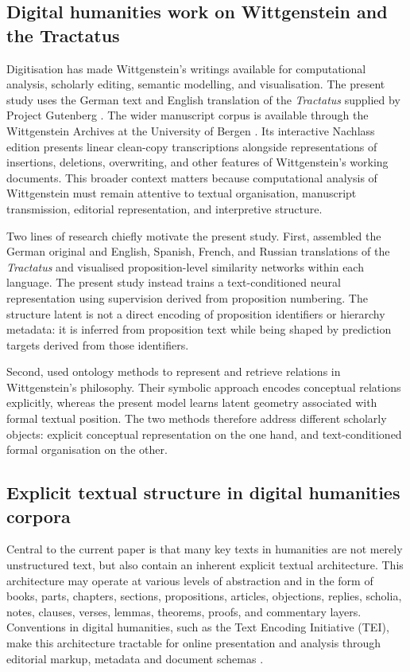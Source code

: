 \documentclass[webpdf,modern,medium,namedate]{oup-authoring-template}
\begin{document}
\subsection{Digital humanities work on Wittgenstein and the Tractatus}
Digitisation has made Wittgenstein's writings available for computational analysis, scholarly editing, semantic modelling, and visualisation. The present study uses the German text and English translation of the \emph{Tractatus} supplied by Project Gutenberg \citep{projectgutenbergtractatus}. The wider manuscript corpus is available through the Wittgenstein Archives at the University of Bergen \citeyearpar{wittgenstein2016bergen}. Its interactive Nachlass edition presents linear clean-copy transcriptions alongside representations of insertions, deletions, overwriting, and other features of Wittgenstein's working documents. This broader context matters because computational analysis of Wittgenstein must remain attentive to textual organisation, manuscript transmission, editorial representation, and interpretive structure.

Two lines of research chiefly motivate the present study. First, \citet{bucur2016tractatus} assembled the German original and English, Spanish, French, and Russian translations of the \emph{Tractatus} and visualised proposition-level similarity networks within each language. The present study instead trains a text-conditioned neural representation using supervision derived from proposition numbering. The structure latent is not a direct encoding of proposition identifiers or hierarchy metadata: it is inferred from proposition text while being shaped by prediction targets derived from those identifiers.

Second, \citet{pichler2013sharing} used ontology methods to represent and retrieve relations in Wittgenstein's philosophy. Their symbolic approach encodes conceptual relations explicitly, whereas the present model learns latent geometry associated with formal textual position. The two methods therefore address different scholarly objects: explicit conceptual representation on the one hand, and text-conditioned formal organisation on the other.

\subsection{Explicit textual structure in digital humanities corpora}
Central to the current paper is that many key texts in humanities are not merely unstructured text, but also contain an inherent explicit textual architecture. This architecture may operate at various levels of abstraction and in the form of books, parts, chapters, sections, propositions, articles, objections, replies, scholia, notes, clauses, verses, lemmas, theorems, proofs, and commentary layers. Conventions in digital humanities, such as the Text Encoding Initiative (TEI), make this architecture tractable for online presentation and analysis through editorial markup, metadata and document schemas \citep{tei2026guidelines}.
\end{document}
